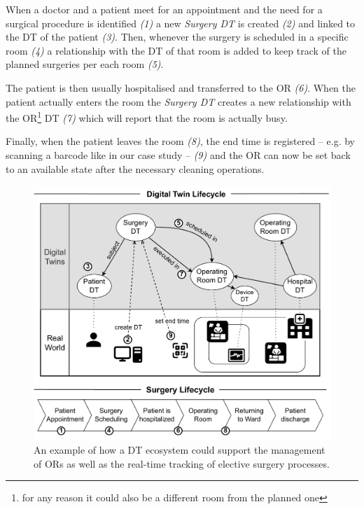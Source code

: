 When a doctor and a patient meet for an appointment and the need for a surgical procedure is identified \emph{(1)} a new \textit{Surgery DT} is created \emph{(2)} and linked to the DT of the patient \emph{(3)}. 
%
Then, whenever the surgery is scheduled in a specific room \emph{(4)} a relationship with the DT of that room is added to keep track of the planned surgeries per each room \emph{(5)}.

The patient is then usually hospitalised and transferred to the OR \emph{(6)}. When the patient actually enters the room the \textit{Surgery DT} creates a new relationship with the OR\footnote{for any reason it could also be a different room from the planned one} DT \emph{(7)} which will report that the room is actually busy.

Finally, when the patient leaves the room \emph{(8)}, the end time is registered -- e.g. by scanning a barcode like in our case study -- \emph{(9)} and the OR can now be set back to an available state after the necessary cleaning operations.

\begin{figure}
    \centering
    \includegraphics[width=\columnwidth]{figures/orm/DTORM.pdf}
    \caption{An example of how a DT ecosystem could support the management of ORs as well as the real-time tracking of elective surgery processes.}
    \label{fig:dt ecosystem}
\end{figure}

%

